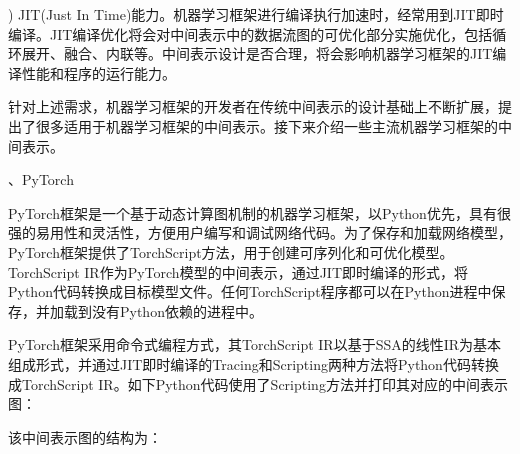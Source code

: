 \documentclass[letterpaper,10pt,english]{sphinxmanual}
\begin{document}
) JIT(Just In
Time)能力。机器学习框架进行编译执行加速时，经常用到JIT即时编译。JIT编译优化将会对中间表示中的数据流图的可优化部分实施优化，包括循环展开、融合、内联等。中间表示设计是否合理，将会影响机器学习框架的JIT编译性能和程序的运行能力。

\sphinxAtStartPar
针对上述需求，机器学习框架的开发者在传统中间表示的设计基础上不断扩展，提出了很多适用于机器学习框架的中间表示。接下来介绍一些主流机器学习框架的中间表示。

、PyTorch

\sphinxAtStartPar
PyTorch框架是一个基于动态计算图机制的机器学习框架，以Python优先，具有很强的易用性和灵活性，方便用户编写和调试网络代码。为了保存和加载网络模型，PyTorch框架提供了TorchScript方法，用于创建可序列化和可优化模型。TorchScript
IR作为PyTorch模型的中间表示，通过JIT即时编译的形式，将Python代码转换成目标模型文件。任何TorchScript程序都可以在Python进程中保存，并加载到没有Python依赖的进程中。

\sphinxAtStartPar
PyTorch框架采用命令式编程方式，其TorchScript
IR以基于SSA的线性IR为基本组成形式，并通过JIT即时编译的Tracing和Scripting两种方法将Python代码转换成TorchScript
IR。如下Python代码使用了Scripting方法并打印其对应的中间表示图：

\begin{sphinxVerbatim}[commandchars=\\\{\}]
 

 
      
       
            
          
     

\end{sphinxVerbatim}

\sphinxAtStartPar
该中间表示图的结构为：
\end{document}
